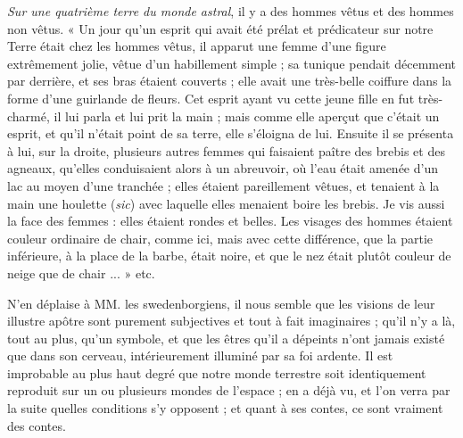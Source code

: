 \documentclass[a4paper, 11pt, oneside]{article}
\begin{document}
\emph{Sur une quatrième terre du monde astral}, il y a des hommes vêtus et des hommes non vêtus. « Un jour qu'un esprit qui avait été prélat et prédicateur sur notre Terre était chez les hommes vêtus, il apparut une femme d'une figure extrêmement jolie, vêtue d'un habillement simple ; sa tunique pendait décemment par derrière, et ses bras étaient couverts ; elle avait une très-belle coiffure dans la forme d'une guirlande de fleurs. Cet esprit ayant vu cette jeune fille en fut très-charmé, il lui parla et lui prit la main ; mais comme elle aperçut que c'était un esprit, et qu'il n'était point de sa terre, elle s'éloigna de lui. Ensuite il se présenta à lui, sur la droite, plusieurs autres femmes qui faisaient paître des brebis et des agneaux, qu'elles conduisaient alors à un abreuvoir, où l'eau était amenée d'un lac au moyen d'une tranchée ; elles étaient pareillement vêtues, et tenaient à la main une houlette (\emph{sic}) avec laquelle elles menaient boire les brebis. Je vis aussi la face des femmes : elles étaient rondes et belles. Les visages des hommes étaient couleur ordinaire de chair, comme ici, mais avec cette différence, que la partie inférieure, à la place de la barbe, était noire, et que le nez était plutôt couleur de neige que de chair ... » etc.

N'en déplaise à MM. les swedenborgiens, il nous semble que les visions de leur illustre apôtre sont purement subjectives et tout à fait imaginaires ; qu'il n'y a là, tout au plus, qu'un symbole, et que les êtres qu'il a dépeints n'ont jamais existé que dans son cerveau, intérieurement illuminé par sa foi ardente. Il est improbable au plus haut degré que notre monde terrestre soit identiquement reproduit sur un ou plusieurs mondes de l'espace ; en a déjà vu, et l'on verra par la suite quelles conditions s'y opposent ; et quant à ses contes, ce sont vraiment des contes.
\end{document}
